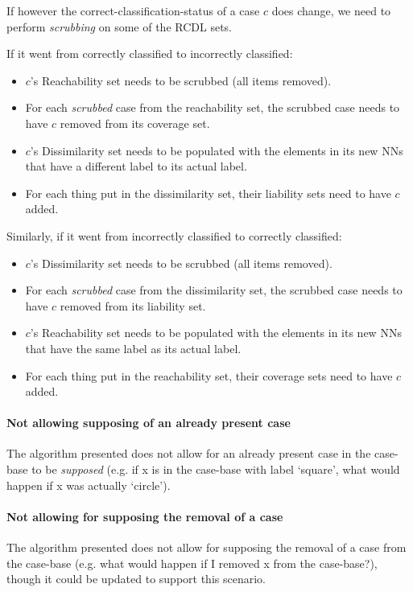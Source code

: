 \documentclass[a4paper,11pt]{report}
\begin{document}
If however the correct-classification-status of a case $c$ does change, we need to perform \emph{scrubbing} on some of the RCDL sets.

If it went from correctly classified to incorrectly classified:
\begin{itemize}
	\item $c$'s Reachability set needs to be scrubbed (all items removed).
	\item For each \emph{scrubbed} case from the reachability set, the scrubbed case needs to have $c$ removed from its coverage set.
	\item $c$'s Dissimilarity set needs to be populated with the elements in its new NNs that have a different label to its actual label.
	\item For each thing put in the dissimilarity set, their liability sets need to have $c$ added.
\end{itemize}

Similarly, if it went from incorrectly classified to correctly classified:
\begin{itemize}
	\item $c$'s Dissimilarity set needs to be scrubbed (all items removed).
	\item For each \emph{scrubbed} case from the dissimilarity set, the scrubbed case needs to have $c$ removed from its liability set.
	\item $c$'s Reachability set needs to be populated with the elements in its new NNs that have the same label as its actual label.
	\item For each thing put in the reachability set, their coverage sets need to have $c$ added.
\end{itemize}

\paragraph{Not allowing supposing of an already present case}
The algorithm presented does not allow for an already present case in the case-base to be \emph{supposed} (e.g. if x is in the case-base with label `square', what would happen if x was actually `circle').

\paragraph{Not allowing for supposing the removal of a case}
The algorithm presented does not allow for supposing the removal of a case from the case-base (e.g. what would happen if I removed x from the case-base?), though it could be updated to support this scenario.
\end{document}
